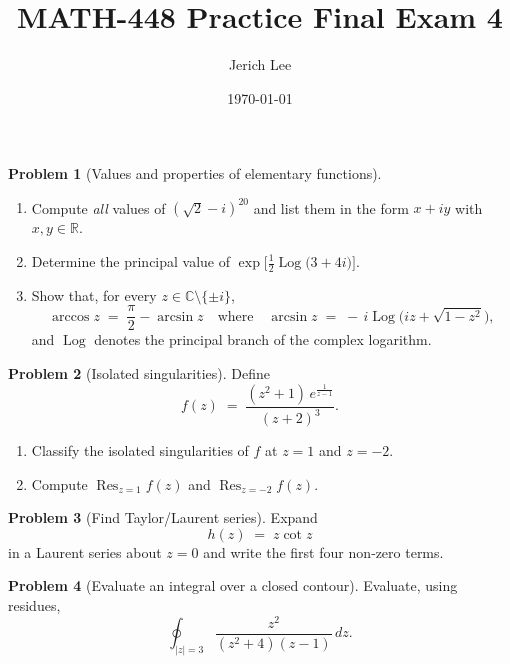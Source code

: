 \documentclass[12pt]{article}
\title{MATH-448 Practice Final Exam 4}
\author{Jerich Lee}
\date{\today}
\DeclareMathOperator{\Log}{Log}
\theoremstyle{definition} %
\newtheorem{problem}{Problem}
\theoremstyle{plain} %
\begin{document}
\maketitle
\pagebreak
  
  \begin{problem}[Values and properties of elementary functions]
  \begin{enumerate}[label=(\alph*),itemsep=6pt]
    \item Compute \emph{all} values of \((\sqrt{2}-i)^{20}\) and list them in the form \(x+iy\) with \(x,y\in\mathbb{R}\).
    \item Determine the principal value of \(\displaystyle\exp\!\bigl[\tfrac12\Log\!\bigl(3+4i\bigr)\bigr]\).
    \item Show that, for every \(z\in\mathbb{C}\setminus\{\pm i\}\),
          \[
            \arccos z \;=\; \frac{\pi}{2}-\arcsin z
            \quad\text{where}\quad
            \arcsin z \;=\; -\,i\Log\!\bigl(iz+\sqrt{1-z^{2}}\bigr),
          \]
          and \(\Log\) denotes the principal branch of the complex logarithm.
  \end{enumerate}
  \end{problem}
  
  \pagebreak
  
  \begin{problem}[Isolated singularities]
  Define
  \[
    f(z)\;=\;\frac{(z^{2}+1)\,e^{\tfrac{1}{z-1}}}{(z+2)^{3}}.
  \]
  \begin{enumerate}[label=(\alph*),itemsep=6pt]
    \item Classify the isolated singularities of \(f\) at \(z=1\) and \(z=-2\).
    \item Compute \(\operatorname*{Res}_{z=1}f(z)\) and \(\operatorname*{Res}_{z=-2}f(z)\).
  \end{enumerate}
  \end{problem}
  
  \pagebreak
  
  \begin{problem}[Find Taylor/Laurent series]
  Expand
  \[
    h(z)\;=\;z\cot z
  \]
  in a Laurent series about \(z=0\) and write the first four non‑zero terms.
  \end{problem}
  
  \pagebreak
  
  \begin{problem}[Evaluate an integral over a closed contour]
  Evaluate, using residues,
  \[
    \oint_{\lvert z\rvert = 3}\frac{z^{2}}{(z^{2}+4)(z-1)}\,dz.
  \]
  \end{problem}
  
\end{document}
